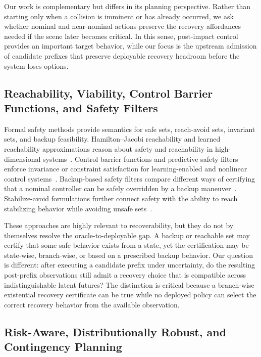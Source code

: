 \documentclass[conference]{IEEEtran}
\begin{document}
Our work is complementary but differs in its planning perspective.  Rather than starting only when a collision is imminent or has already occurred, we ask whether nominal and near-nominal actions preserve the recovery affordances needed if the scene later becomes critical.  In this sense, post-impact control provides an important target behavior, while our focus is the upstream admission of candidate prefixes that preserve deployable recovery headroom before the system loses options.

\subsection{Reachability, Viability, Control Barrier Functions, and Safety Filters}

Formal safety methods provide semantics for safe sets, reach-avoid sets, invariant sets, and backup feasibility.  Hamilton--Jacobi reachability and learned reachability approximations reason about safety and reachability in high-dimensional systems~\cite{bansal2017hamilton,bansal2021deepreach,lin2023generating,borquez2022parameter}.  Control barrier functions and predictive safety filters enforce invariance or constraint satisfaction for learning-enabled and nonlinear control systems~\cite{ames2019control,koller2018learning,wabersich2021predictive,tearle2021predictive}.  Backup-based safety filters compare different ways of certifying that a nominal controller can be safely overridden by a backup maneuver~\cite{kim2026backup}.  Stabilize-avoid formulations further connect safety with the ability to reach stabilizing behavior while avoiding unsafe sets~\cite{so2023solving}.

These approaches are highly relevant to recoverability, but they do not by themselves resolve the oracle-to-deployable gap.  A backup or reachable set may certify that some safe behavior exists from a state, yet the certification may be state-wise, branch-wise, or based on a prescribed backup behavior.  Our question is different: after executing a candidate prefix under uncertainty, do the resulting post-prefix observations still admit a recovery choice that is compatible across indistinguishable latent futures?  The distinction is critical because a branch-wise existential recovery certificate can be true while no deployed policy can select the correct recovery behavior from the available observation.

\subsection{Risk-Aware, Distributionally Robust, and Contingency Planning}
\end{document}
